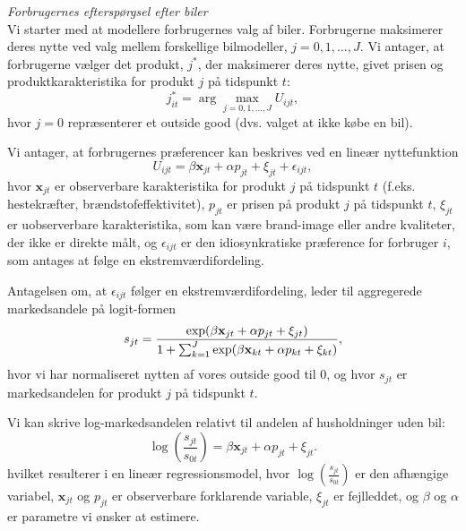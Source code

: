 \documentclass[a4paper,12pt]{article}
\begin{document}
\noindent\emph{Forbrugernes efterspørgsel efter biler}\\
Vi starter med at modellere forbrugernes valg af biler. Forbrugerne maksimerer deres nytte ved valg mellem forskellige bilmodeller, 
$j=0,1,\dots,J$. Vi antager, at forbrugerne vælger det produkt, $j^*$, der maksimerer deres nytte, givet prisen og produktkarakteristika for produkt $j$ på tidspunkt $t$:
\[
j_{it}^* = \arg \max_{j=0,1,\dots, J} U_{ijt},
\]
hvor $j=0$ repræsenterer et outside good (dvs. valget at ikke købe en bil).

Vi antager, at forbrugernes præferencer kan beskrives ved en lineær nyttefunktion
\[
U_{ijt} = \beta \mathbf{x}_{jt} + \alpha p_{jt} + \xi_{jt} + \epsilon_{ijt},
\]
hvor $\mathbf{x}_{jt}$ er observerbare karakteristika for produkt $j$ på tidspunkt $t$ (f.eks. hestekræfter, brændstofeffektivitet), $p_{jt}$ er prisen på produkt $j$ på tidspunkt $t$, $\xi_{jt}$ er uobserverbare karakteristika, som kan være brand-image eller andre kvaliteter, der ikke er direkte målt, og $\epsilon_{ijt}$ er den idiosynkratiske præference for forbruger $i$, som antages at følge en ekstremværdifordeling. 

Antagelsen om, at $\epsilon_{ijt}$ følger en ekstremværdifordeling, leder til aggregerede markedsandele på logit-formen
\begin{equation*}
s_{jt} = \frac{\exp(\beta \mathbf{x}_{jt} + \alpha p_{jt} + \xi_{jt})}{1 + \sum_{k=1}^J \exp(\beta \mathbf{x}_{kt} + \alpha p_{kt} + \xi_{kt})},
\vspace{1em}
\end{equation*}
hvor vi har normaliseret nytten af vores outside good til 0, og hvor $s_{jt}$ er markedsandelen for produkt $j$ på tidspunkt $t$.

Vi kan skrive log-markedsandelen relativt til andelen af husholdninger uden bil:
\begin{equation}
    \log\left(\frac{s_{jt}}{s_{0t}}\right) = \beta \mathbf{x}_{jt} + \alpha p_{jt} + \xi_{jt}. \label{eq:A-demand}    
\end{equation}
hvilket resulterer i en lineær regressionsmodel, hvor $\log\left(\frac{s_{jt}}{s_{0t}}\right)$ er den afhængige variabel, $\mathbf{x}_{jt}$ og $p_{jt}$ er observerbare forklarende variable, $\xi_{jt}$ er fejlleddet, og $\beta$ og $\alpha$ er parametre vi ønsker at estimere.
\\ \medskip 
\end{document}
